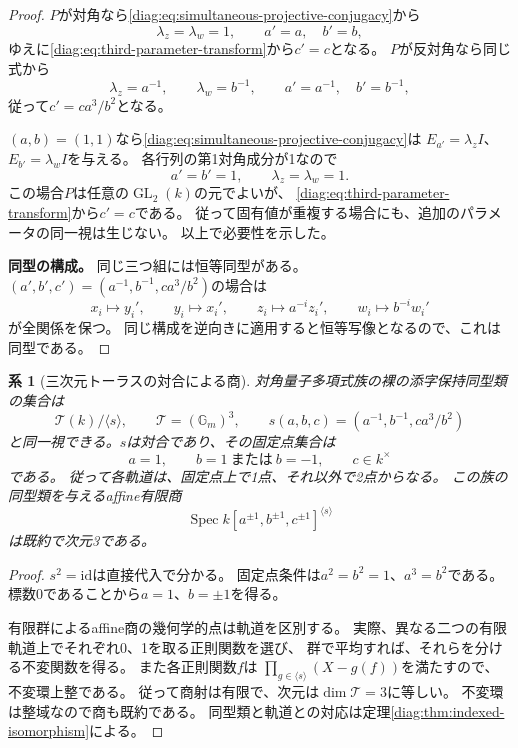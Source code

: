 \documentclass[11pt,a4paper]{ltjsarticle}
\newtheorem{corollary}[theorem]{系}
\theoremstyle{definition}
\newcommand{\GL}{\operatorname{GL}}
\begin{document}
\begin{proof}
$P$が対角なら\eqref{diag:eq:simultaneous-projective-conjugacy}から
\[
\lambda_z=\lambda_w=1,\qquad a'=a,\quad b'=b,
\]
ゆえに\eqref{diag:eq:third-parameter-transform}から$c'=c$となる。
$P$が反対角なら同じ式から
\[
\lambda_z=a^{-1},\qquad\lambda_w=b^{-1},
\qquad a'=a^{-1},\quad b'=b^{-1},
\]
従って$c'=ca^3/b^2$となる。

$(a,b)=(1,1)$なら\eqref{diag:eq:simultaneous-projective-conjugacy}は
$E_{a'}=\lambda_zI$、$E_{b'}=\lambda_wI$を与える。
各行列の第1対角成分が1なので
\[
a'=b'=1,\qquad\lambda_z=\lambda_w=1.
\]
この場合$P$は任意の$\GL_2(k)$の元でよいが、
\eqref{diag:eq:third-parameter-transform}から$c'=c$である。
従って固有値が重複する場合にも、追加のパラメータの同一視は生じない。
以上で必要性を示した。

\par\smallskip\noindent\textbf{同型の構成。}\quad
同じ三つ組には恒等同型がある。
$(a',b',c')=(a^{-1},b^{-1},ca^3/b^2)$の場合は
\[
x_i\longmapsto y_i',\qquad
y_i\longmapsto x_i',\qquad
z_i\longmapsto a^{-i}z_i',\qquad
w_i\longmapsto b^{-i}w_i'
\]
が全関係を保つ。
同じ構成を逆向きに適用すると恒等写像となるので、これは同型である。
\end{proof}

\begin{corollary}[三次元トーラスの対合による商]
\label{diag:cor:quotient}
対角量子多項式族の裸の添字保持同型類の集合は
\[
\mathcal T(k)/\langle s\rangle,\qquad
\mathcal T=(\mathbb G_m)^3,\qquad
s(a,b,c)=\left(a^{-1},b^{-1},ca^3/b^2\right)
\]
と同一視できる。$s$は対合であり、その固定点集合は
\[
a=1,\qquad b=1\ \text{または}\ b=-1,\qquad c\in k^\times
\]
である。
従って各軌道は、固定点上で1点、それ以外で2点からなる。
この族の同型類を与えるaffine有限商
\[
\operatorname{Spec}
k[a^{\pm1},b^{\pm1},c^{\pm1}]^{\langle s\rangle}
\]
は既約で次元3である。
\end{corollary}
\begin{proof}
$s^2=\mathrm{id}$は直接代入で分かる。
固定点条件は$a^2=b^2=1$、$a^3=b^2$である。
標数0であることから$a=1$、$b=\pm1$を得る。

有限群によるaffine商の幾何学的点は軌道を区別する。
実際、異なる二つの有限軌道上でそれぞれ0、1を取る正則関数を選び、
群で平均すれば、それらを分ける不変関数を得る。
また各正則関数$f$は
$\prod_{g\in\langle s\rangle}(X-g(f))$を満たすので、不変環上整である。
従って商射は有限で、次元は$\dim\mathcal T=3$に等しい。
不変環は整域なので商も既約である。
同型類と軌道との対応は定理\ref{diag:thm:indexed-isomorphism}による。
\end{proof}
\end{document}
